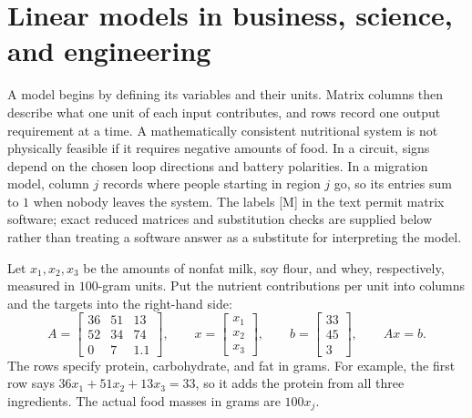 \section{Linear models in business, science, and engineering}
A model begins by defining its variables and their units. Matrix columns
then describe what one unit of each input contributes, and rows record
one output requirement at a time. A mathematically consistent nutritional
system is not physically feasible if it requires negative amounts of food.
In a circuit, signs depend on the chosen loop directions and battery
polarities. In a migration model, column $j$ records where people starting
in region $j$ go, so its entries sum to $1$ when nobody leaves the system.
The labels [M] in the text permit matrix software; exact reduced matrices
and substitution checks are supplied below rather than treating a software
answer as a substitute for interpreting the model.

Let $x_1,x_2,x_3$ be the amounts of nonfat milk, soy flour, and whey,
respectively, measured in $100$-gram units. Put the nutrient contributions
per unit into columns and the targets into the right-hand side:
\[
 A=\begin{bmatrix}36&51&13\\52&34&74\\0&7&1.1\end{bmatrix},\qquad
 x=\begin{bmatrix}x_1\\x_2\\x_3\end{bmatrix},\qquad
 b=\begin{bmatrix}33\\45\\3\end{bmatrix},\qquad Ax=b.
\]
The rows specify protein, carbohydrate, and fat in grams. For example,
the first row says $36x_1+51x_2+13x_3=33$, so it adds the protein
from all three ingredients. The actual food masses in grams are $100x_j$.

